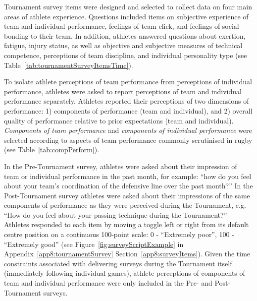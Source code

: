 \begin{CJK}{UTF8}{gbsn}
Tournament survey items were designed and selected to collect data on four main areas of athlete experience.  Questions included items on subjective experience of team and individual performance, feelings of team click, and feelings of social bonding to their team.  In addition, athletes answered questions about exertion, fatigue, injury status, as well as objective and subjective measures of technical competence, perceptions of team discipline, and individual personality type (see Table~\ref{tab:tournamentSurveyItemsTime}).






To isolate athlete perceptions of team performance from perceptions of individual performance, athletes were asked to report perceptions of team and individual performance separately.  Athletes reported their perceptions of two dimensions of performance: 1) components of performance (team and individual), and 2) overall quality of performance relative to prior expectations (team and individual).  \textit{Components of team performance} and \textit{components of individual performance} were selected according to aspects of team performance commonly scrutinised in rugby (see Table~\ref{tab:compPerform}).




In the Pre-Tournament survey, athletes were asked about their impression of team or individual performance in the past month, for example: ``how do you feel about your team's coordination of the defensive line over the past month?''  In the Post-Tournament survey athletes were asked about their impressions of the same components of performance as they were perceived during the Tournament, e.g. ``How do you feel about your passing technique during the Tournament?'' Athletes responded to each item by moving a toggle left or right from its default centre position on a continuous 100-point scale: 0 - ``Extremely poor'', 100 - ``Extremely good'' (see Figure~\ref{fig:surveyScriptExample} in Appendix~\ref{app8:tournamentSurvey} Section~\ref{app8:surveyItems}).  Given the time constraints associated with delivering surveys during the Tournament itself (immediately following individual games), athlete perceptions of components of team and individual performance were only included in the Pre- and Post-Tournament surveys.


\end{CJK}
